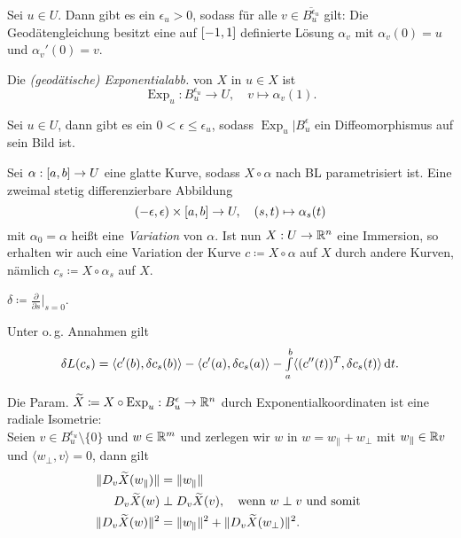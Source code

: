 \documentclass{cheat-sheet}
\DeclareMathOperator{\Exp}{Exp} %
\begin{document}
\begin{satz}
  Sei $u \in U$. Dann gibt es ein $\epsilon_u > 0$, sodass für alle $v \in \overline{B_u^{\epsilon_u}}$ gilt: Die Geodätengleichung besitzt eine auf $\left[ -1, 1 \right]$ definierte Lösung $\alpha_v$ mit $\alpha_v(0) = u$ und $\alpha_v'(0) = v$.
\end{satz}

\begin{defn}
  Die \emph{(geodätische) Exponentialabb.} von $X$ in $u \in X$ ist
  \[ \Exp_u : B_u^{\epsilon_u} \to U, \quad v \mapsto \alpha_v(1). \]
\end{defn}

\begin{defn}
  Sei $u \in U$, dann gibt es ein $0 < \epsilon \leq \epsilon_u$, sodass $\Exp_u|B_u^\epsilon$ ein Diffeomorphismus auf sein Bild ist.
\end{defn}


\begin{defn}
  Sei $\alpha : \left[ a, b \right] \to U$ eine glatte Kurve, sodass $X \circ \alpha$ nach BL parametrisiert ist. Eine zweimal stetig differenzierbare Abbildung
  \[ \left( -\epsilon, \epsilon \right) \times \left[ a, b \right] \to U, \quad (s, t) \mapsto \alpha_s(t) \]
  mit $\alpha_0 = \alpha$ heißt eine \emph{Variation} von $\alpha$. Ist nun $X : U \to \mathbb{R}^n$ eine Immersion, so erhalten wir auch eine Variation der Kurve $c \coloneqq X \circ \alpha$ auf $X$ durch andere Kurven, nämlich $c_s \coloneqq X \circ \alpha_s$ auf $X$.
\end{defn}

\begin{nota}
  $\delta \coloneqq \tfrac{\partial}{\partial s}|_{s=0}$.
\end{nota}

\begin{satz}
  Unter o.\,g. Annahmen gilt
  \[ \delta L(c_s) = \langle c'(b), \delta c_s(b) \rangle - \langle c'(a), \delta c_s(a) \rangle - {\textstyle \int\limits_{a}^{b}} \langle (c''(t))^T, \delta c_s(t) \rangle \,\mathrm{d} t. \]
\end{satz}

\begin{satz}
  Die Param. $\widetilde{X} \coloneqq X \circ \Exp_u : B_u^\epsilon \to \R^n$ durch Exponentialkoordinaten ist eine radiale Isometrie: \\
  Seien $v \in B_u^{\epsilon_u} \setminus \{0\}$ und $w \in \mathbb{R}^m$ und zerlegen wir $w$ in $w = w_{\|} + w_\perp$ mit $w_{\|} \in \mathbb{R} v$ und $\langle w_\perp, v \rangle = 0$, dann gilt
  \begin{align*}
    \lVert D_v \widetilde{X}(w_{\|})\rVert &= \lVert w_{\|}\rVert\\
    D_v \widetilde{X}(w) &\perp D_v \widetilde{X}(v), \quad \text{wenn $w \perp v$  und somit }\\
    \lVert D_v \widetilde{X}(w)\rVert^2 &= \lVert w_{\|}\rVert^2 + \lVert D_v \widetilde{X}(w_{\perp})\rVert^2.
  \end{align*}
\end{satz}
\end{document}
